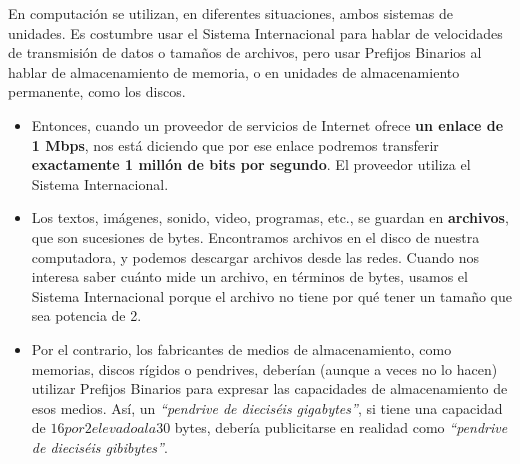 \documentclass[spanish,A4,]{article}
\begin{document}
En computación se utilizan, en diferentes situaciones, ambos sistemas de
unidades. Es costumbre usar el Sistema Internacional para hablar de
velocidades de transmisión de datos o tamaños de archivos, pero usar
Prefijos Binarios al hablar de almacenamiento de memoria, o en unidades
de almacenamiento permanente, como los discos.

\begin{itemize}
\itemsep1pt\parskip0pt
\item
  Entonces, cuando un proveedor de servicios de Internet ofrece
  \textbf{un enlace de 1 Mbps}, nos está diciendo que por ese enlace
  podremos transferir \textbf{exactamente 1 millón de bits por segundo}.
  El proveedor utiliza el Sistema Internacional.
\item
  Los textos, imágenes, sonido, video, programas, etc., se guardan en
  \textbf{archivos}, que son sucesiones de bytes. Encontramos archivos
  en el disco de nuestra computadora, y podemos descargar archivos desde
  las redes. Cuando nos interesa saber cuánto mide un archivo, en
  términos de bytes, usamos el Sistema Internacional porque el archivo
  no tiene por qué tener un tamaño que sea potencia de 2.
\item
  Por el contrario, los fabricantes de medios de almacenamiento, como
  memorias, discos rígidos o pendrives, deberían (aunque a veces no lo
  hacen) utilizar Prefijos Binarios para expresar las capacidades de
  almacenamiento de esos medios. Así, un \emph{``pendrive de dieciséis
  gigabytes''}, si tiene una capacidad de $16  por  2 elevado a la {30}$ bytes,
  debería publicitarse en realidad como \emph{``pendrive de dieciséis
  gibibytes''}.
\end{itemize}
\end{document}
